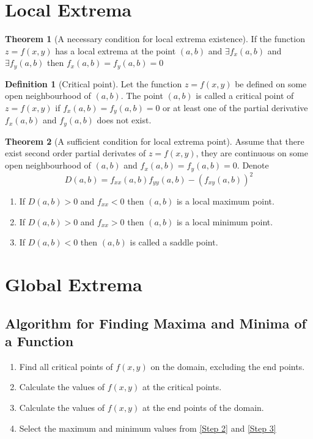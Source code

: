 \documentclass[fleqn, a4paper, 8pt, twoside]{amsart}
\theoremstyle{definition}
\theoremstyle{bluedefinition}
\newtheorem{definition}{Definition}
\theoremstyle{redtheorem}
\newtheorem{theorem}{Theorem}
\begin{document}
\begin{multicols}{2}
\begin{spacing}{0.7}
\section{Local Extrema}

\begin{theorem}[A necessary condition for local extrema existence]
	If the function $z = f(x, y)$ has a local extrema at the point $(a, b)$ and $\exists f_x (a, b)$ and $\exists f_y (a, b)$ then $f_x (a, b) = f_y (a, b) = 0$
\end{theorem}

\begin{definition}[Critical point]
	Let the function $z = f(x, y)$ be defined on some open neighbourhood of $(a, b)$. The point $(a, b)$ is called a critical point of $z = f(x, y)$ if $f_x(a, b) = f_y(a, b) = 0$ or at least one of the partial derivative $f_x(a, b)$ and $f_y(a, b)$ does not exist.
\end{definition}

\begin{theorem}[A sufficient condition for local extrema point]
	Assume that there exist second order partial derivates of $z = f(x,y)$, they are continuous on some open neighbourhood of $(a,b)$ and $f_x(a,b) =f_y(a,b) = 0$. Denote 
	\begin{equation*}
		D(a, b) = f_{xx}(a,b) f_{yy}(a,b) - \left( f_{xy}(a,b) \right)^2
	\end{equation*}
	\begin{enumerate}
		\item If $D(a,b) > 0$ and $f_{xx} < 0$ then $(a,b)$ is a local maximum point.
		\item If $D(a,b) > 0$ and $f_{xx} > 0$ then $(a,b)$ is a local minimum point.
		\item If $D(a,b) < 0$ then $(a,b)$ is called a saddle point.
	\end{enumerate}
\end{theorem}

\section{Global Extrema}

\subsection{Algorithm for Finding Maxima and Minima of a Function}

\begin{enumerate}[label = Step \arabic*]
	\item Find all critical points of $f(x,y)$ on the domain, excluding the end points. \label{Step 1}
	\item Calculate the values of $f(x,y)$ at the critical points. \label{Step 2}
	\item Calculate the values of $f(x,y)$ at the end points of the domain. \label{Step 3}
	\item Select the maximum and minimum values from \ref{Step 2} and \ref{Step 3}
\end{enumerate}


\end{spacing}
\end{multicols}
\end{document}
